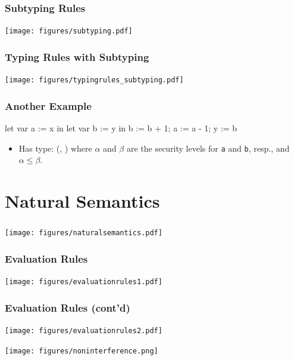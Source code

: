 \documentclass{beamer}
\begin{document}
\begin{frame}[fragile]
\frametitle{Subtyping Rules}
\begin{center}
\texttt{[image: figures/subtyping.pdf]}
\end{center}
\end{frame}

\begin{frame}[fragile]
\frametitle{Typing Rules with Subtyping}
\begin{center}
\texttt{[image: figures/typingrules\_subtyping.pdf]}
\end{center}
\end{frame}


\begin{frame}[fragile]
\frametitle{Another Example}

\begin{center}
\begin{normalcode}
      let var a := x in
      let var b := y in
               b := b + 1;
               a := a - 1;
            y := b
\end{normalcode}
\end{center}
\pause
\begin{itemize}
\item Has type: \<\beta {}(\alpha, \beta {})\> where $\alpha$ and $\beta$ are the security levels for \texttt{a} and \texttt{b}, resp., and \(\alpha \leq \beta\).
\end{itemize}


\end{frame}

\section{Natural Semantics}

\begin{frame}[fragile]
\frametitle{}
\begin{center}
\texttt{[image: figures/naturalsemantics.pdf]}
\end{center}
\end{frame}

\begin{frame}[fragile]
\frametitle{Evaluation Rules}
\begin{center}
\texttt{[image: figures/evaluationrules1.pdf]}
\end{center}
\end{frame}

\begin{frame}[fragile]
\frametitle{Evaluation Rules (cont'd)}
\begin{center}
\texttt{[image: figures/evaluationrules2.pdf]}
\end{center}
\end{frame}


\begin{frame}[fragile]
\begin{center}
\texttt{[image: figures/noninterference.png]}
\end{center}
\end{frame}
\end{document}
